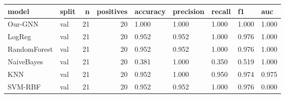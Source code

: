 \begin{tabular}{llrrlllll}
\toprule
model & split & n & positives & accuracy & precision & recall & f1 & auc \\
\midrule
Our-GNN & val & 21 & 20 & 1.000 & 1.000 & 1.000 & 1.000 & 1.000 \\
LogReg & val & 21 & 20 & 0.952 & 0.952 & 1.000 & 0.976 & 1.000 \\
RandomForest & val & 21 & 20 & 0.952 & 0.952 & 1.000 & 0.976 & 1.000 \\
NaiveBayes & val & 21 & 20 & 0.381 & 1.000 & 0.350 & 0.519 & 1.000 \\
KNN & val & 21 & 20 & 0.952 & 1.000 & 0.950 & 0.974 & 0.975 \\
SVM-RBF & val & 21 & 20 & 0.952 & 0.952 & 1.000 & 0.976 & 0.000 \\
\bottomrule
\end{tabular}
